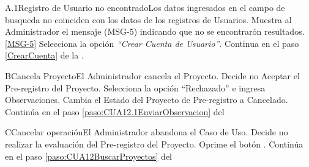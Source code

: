 	\begin{UCtrayectoriaA}{A.1}{Registro de Usuario no encontrado}{Los datos ingresados en el campo de busqueda no coinciden con los datos de los registros de Usuarios.}
			\UCpaso Muestra al Administrador el mensaje (MSG-5) indicando que no se encontrarón resultados.\ref{MSG-5}
			\UCpaso[\UCactor] Selecciona la opción \textit{``Crear Cuenta de Usuario''}.
			\UCpaso Continua en el paso \ref{CrearCuenta} de la .
	\end{UCtrayectoriaA}

	\begin{UCtrayectoriaA}{B}{Cancela Proyecto}{El Administrador cancela el Proyecto.}
			\UCpaso[\UCactor] Decide no Aceptar el Pre-registro del Proyecto.
			\UCpaso[\UCactor] Selecciona la opción ``Rechazado'' e ingresa Observaciones.
			\UCpaso Cambia el Estado del Proyecto de Pre-registro a Cancelado.
			\UCpaso Continúa en el paso \ref{paso:CUA12.1EnviarObservacion} del  
	\end{UCtrayectoriaA}

	\begin{UCtrayectoriaA}{C}{Cancelar operación}{El Administrador abandona el Caso de Uso.}
			\UCpaso[\UCactor] Decide no realizar la evaluación del Pre-registro del Proyecto.
			\UCpaso[\UCactor] Oprime el botón .
			\UCpaso Continúa en el paso \ref{paso:CUA12BuscarProyectos} del  
	\end{UCtrayectoriaA}

